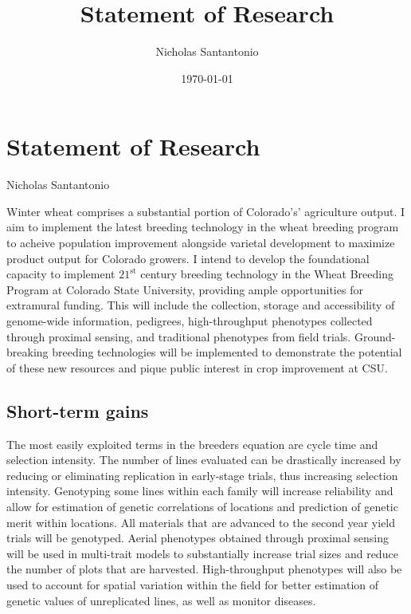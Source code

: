 \documentclass[11pt]{article}
\title{Statement of Research}
\author{Nicholas Santantonio}
\date{\today}
\begin{document}
\section*{\centering Statement of Research}
\begin{center} Nicholas Santantonio \end{center}


\noindent Winter wheat comprises a substantial portion of Colorado's' agriculture output. I aim to implement the latest breeding technology in the wheat breeding program to acheive population improvement alongside varietal development to maximize product output for Colorado growers. I intend to develop the foundational capacity to implement $21^\text{st}$ century breeding technology in the Wheat Breeding Program at Colorado State University, providing ample opportunities for extramural funding. This will include the collection, storage and accessibility of genome-wide information, pedigrees, high-throughput phenotypes collected through proximal sensing, and traditional phenotypes from field trials. Ground-breaking breeding technologies will be implemented to demonstrate the potential of these new resources and pique public interest in crop improvement at CSU.  

\subsection*{Short-term gains}


The most easily exploited terms in the breeders equation are cycle time and selection intensity. The number of lines evaluated can be drastically increased by reducing or eliminating replication in early-stage trials, thus increasing selection intensity. Genotyping some lines within each family will increase reliability and allow for estimation of genetic correlations of locations and prediction of genetic merit within locations. All materials that are advanced to the second year yield trials will be genotyped. Aerial phenotypes obtained through proximal sensing will be used in multi-trait models to substantially increase trial sizes and reduce the number of plots that are harvested. High-throughput phenotypes will also be used to account for spatial variation within the field for better estimation of genetic values of unreplicated lines, as well as monitor diseases.%
\end{document}
